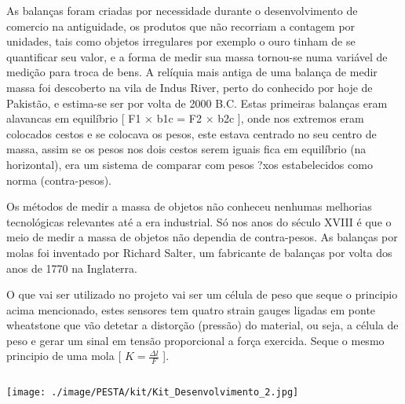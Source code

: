 {
	As balanças foram criadas por necessidade durante o desenvolvimento de comercio na antiguidade, os produtos que não recorriam a contagem por unidades, tais como objetos irregulares por exemplo o ouro tinham de se quantificar seu valor, e a forma de medir sua massa tornou-se numa variável de medição para troca de bens. A relíquia mais antiga de uma balança de medir massa foi descoberto na vila de Indus River, perto do conhecido por hoje de Pakistão, e estima-se ser por volta de 2000 B.C.
	Estas primeiras balanças eram alavancas em equilíbrio [ F1 × b1c = F2 × b2c ], onde nos extremos eram colocados cestos e se colocava os pesos, este estava centrado no seu centro de massa, assim se os pesos nos dois cestos serem iguais fica em equilíbrio (na horizontal), era um sistema de comparar com pesos ?xos estabelecidos como norma (contra-pesos).
	
	Os métodos de medir a massa de objetos não conheceu nenhumas melhorias tecnológicas relevantes até a era industrial. Só nos anos do século XVIII é que o meio de medir a massa de objetos não dependia de contra-pesos. As balanças por molas foi inventado por Richard Salter, um fabricante de balanças por volta dos anos de 1770 na Inglaterra.
	
	O que vai ser utilizado no projeto vai ser um célula de peso que seque o principio acima mencionado, estes sensores tem quatro strain gauges ligadas em ponte wheatstone que vão detetar a distorção (pressão) do material, ou seja, a célula de peso e gerar um sinal em tensão proporcional a força exercida. Seque o mesmo principio de uma mola [ $K= \frac{\Delta l}{F}$ ].
}
\begin{columns}
	{
		\begin{tikzfigure}
			\texttt{[image: ./image/PESTA/kit/Kit\_Desenvolvimento\_2.jpg]}
		\end{tikzfigure}
	}
\end{columns}
\begin{columns}
\end{columns}


